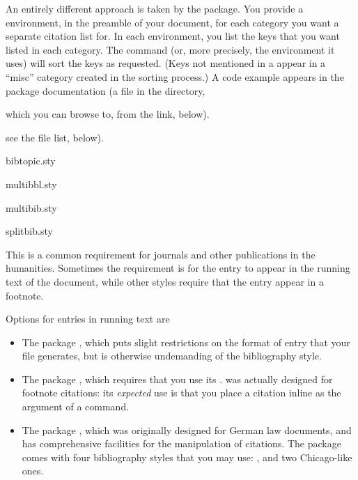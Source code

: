 An entirely different approach is taken by the 
package.  You provide a  environment, in the
preamble of your document, for each category you want a separate
citation list for.  In each environment, you list the  keys
that you want listed in each category.  The  command
(or, more precisely, the  environment it
uses) will sort the keys as requested.  (Keys not mentioned in a
 appear in a ``misc'' category created in the
sorting process.)  A code example appears in the package documentation
(a  file in the  directory,
\begin{htmlversion}
  which you can browse to, from the link, below).
\end{htmlversion}
\htmlignore
  see the file list, below).
\endhtmlignore
\begin{ctanrefs}
\item[bibtopic.sty]
\item[multibbl.sty]
\item[multibib.sty]
\item[splitbib.sty]
\end{ctanrefs}



This is a common requirement for journals and other publications in
the humanities.  Sometimes the requirement is for the entry to appear
in the running text of the document, while other styles require that
the entry appear in a footnote.

Options for entries in running text are
\begin{itemize}
\item The package , which puts slight restrictions
  on the format of entry that your  file generates, but is
  otherwise undemanding of the bibliography style.
\item The package , which requires that you use its
  .   was actually designed for
  footnote citations: its \emph{expected} use is that you place a
  citation inline as the argument of a  command.
\item The package , which was originally designed for
  German law documents, and has comprehensive facilities for the
  manipulation of citations.  The package comes with four bibliography
  styles that you may use: ,  and
  two Chicago-like ones.
\end{itemize}

